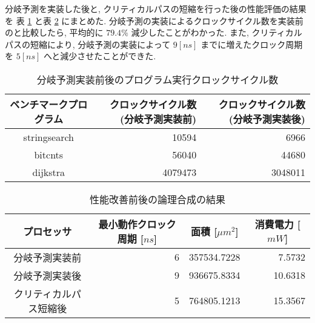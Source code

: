 \documentclass[../improvements.tex]{subfiles}
\begin{document}
  分岐予測を実装した後と, クリティカルパスの短縮を行った後の性能評価の結果を
  表 \ref{table:mibench-improved} と表 \ref{table:logic-synthesis-improved}
  にまとめた.
  分岐予測の実装によるクロックサイクル数を実装前のと比較したら, 
  平均的に $79.4\%$ 減少したことがわかった.
  また, クリティカルパスの短縮により, 分岐予測の実装によって $9[ns]$ までに増えたクロック周期を
  $5[ns]$ へと減少させたことができた.

  \begin{table}[h]
    \centering
    \begin{tabular}{|c|r|r|}
    \hline
    ベンチマークプログラム  & クロックサイクル数 (分岐予測実装前) & クロックサイクル数 (分岐予測実装後) \\ \hline
    stringsearch & 10594               & 6966                                     \\
    bitcnts      & 56040               & 44680                                    \\
    dijkstra     & 4079473             & 3048011                                  \\ \hline
    \end{tabular}
    \caption{分岐予測実装前後のプログラム実行クロックサイクル数}
    \label{table:mibench-improved}
  \end{table}

  \begin{table}[h]
    \centering
    \begin{tabular}{|c|r|r|r|}
    \hline
    プロセッサ       & \multicolumn{1}{c|}{最小動作クロック周期 {[}$ns${]}} & \multicolumn{1}{c|}{面積 {[}$\mu m^2${]}} & \multicolumn{1}{c|}{消費電力 {[}$mW${]}} \\ \hline
    分岐予測実装前         & 6                                        & 357534.7228                                       & 7.5732                             \\
    分岐予測実装後     & 9                                        & 936675.8334                                         & 10.6318                            \\
    クリティカルパス短縮後 & 5                                        & 764805.1213                                         & 15.3567                            \\ \hline
    \end{tabular}
    \caption{性能改善前後の論理合成の結果}
    \label{table:logic-synthesis-improved}
  \end{table}
\end{document}
